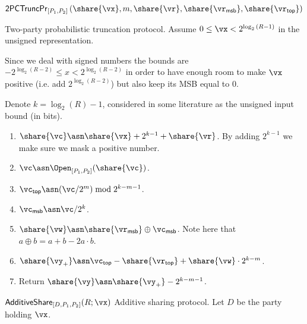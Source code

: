 \msubsubsection
  {$\mathsf{2PCTruncPr}_{[P_1, P_2]} \left( \share{\vx}, m, \share{\vr},
  \share{\vr_{\mathsf{msb}}}, \share{\vr_{\mathsf{top}}} \right)$}
  \label{fig:truncpr-generic}

  Two-party probabilistic truncation protocol. Assume $0 \leq \vx < 2^{\log_2{(R - 1})}$ in the unsigned representation.

  Since we deal with signed numbers the bounds are $-2^{\log_2{(R - 2)}} \leq x <
  2^{\log_2{(R - 2)}}$ in order to have enough room to make $\vx$ positive (i.e.
  add $2^{\log_2{(R-2)}}$) but also keep its MSB equal to $0$.

  Denote $k = \log_2(R) - 1$, considered in some literature as the unsigned input bound (in bits).

  \begin{enumerate}
  \item $\share{\vc} \asn \share{\vx} + 2^{k-1} + \share{\vr}$. By adding $2^{k-1}$ we make sure we mask a positive number.
  \item $\vc \asn \Open_{[P_1, P_2]}(\share{\vc})$.
  \item $\vc_{\mathsf{top}} \asn (\vc / 2^m) \bmod 2^{k-m-1}$.

  \item $\vc_{\mathsf{msb}} \asn \vc / 2^{k}$.
  \item $\share{\vw} \asn \share{\vr_{\mathsf{msb}}} \oplus \vc_{\mathsf{msb}}$. Note here that $a \oplus b = a + b - 2a\cdot b$.
  \item $\share{\vy_+} \asn \vc_{\mathsf{top}} - \share{\vr_{\mathsf{top}}} + \share{\vw}  \cdot 2^{k-m}$.
  \item Return $\share{\vy} \asn \share{\vy_+} - 2^{k-m-1}$.
\end{enumerate}


\msubsubsection
{$\mathsf{AdditiveShare}_{[D, P_1, P_2]}(R; \vx)$}
\label{fig:get-additive}
  Additive sharing protocol. Let $D$ be the party holding $\vx$.

